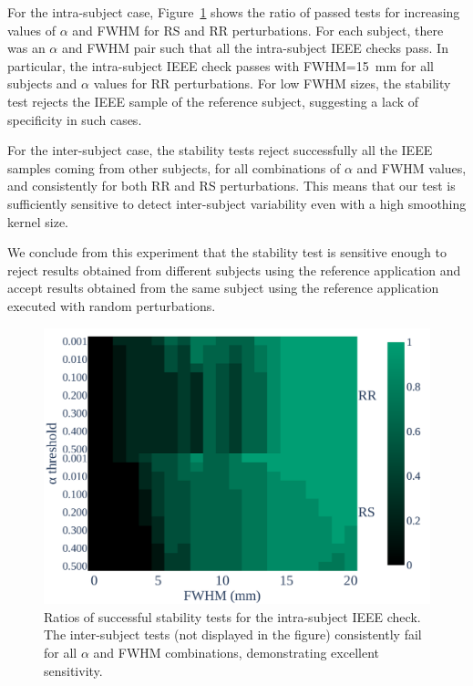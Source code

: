 \documentclass[lettersize,journal]{IEEEtran}
\begin{document}
For the intra-subject case, Figure~\ref{fig:ieee-check} shows the ratio of passed tests for increasing values of $\alpha$ and FWHM for RS and RR perturbations. For each subject, there was an $\alpha$ and FWHM pair such that all the intra-subject IEEE checks pass. In particular, the intra-subject IEEE check passes with FWHM=15~mm for all subjects and $\alpha$ values for RR perturbations.
For low FWHM sizes, the stability test rejects the IEEE sample of the reference subject, suggesting a lack of specificity in such cases.  

For the inter-subject case, the stability tests reject successfully all the IEEE samples coming from other subjects, for all combinations of $\alpha$ and FWHM values, and consistently for both RR and RS perturbations. This means that our test is sufficiently sensitive to detect inter-subject variability even with a high smoothing kernel size.

We conclude from this experiment that the stability test is sensitive enough to reject results obtained from different subjects using the reference application and accept results obtained from the same subject using the reference application executed with random perturbations.

\begin{figure}
    \centering
    \includegraphics[width=\linewidth]{figures/inter-subject/inter_mct_fwe_bonferroni.pdf}
    \caption{Ratios of successful stability tests for the intra-subject IEEE check. The inter-subject tests (not displayed in the figure) consistently fail for all $\alpha$ and FWHM combinations, demonstrating excellent sensitivity.
    }
    \label{fig:ieee-check}
\end{figure}
\end{document}

